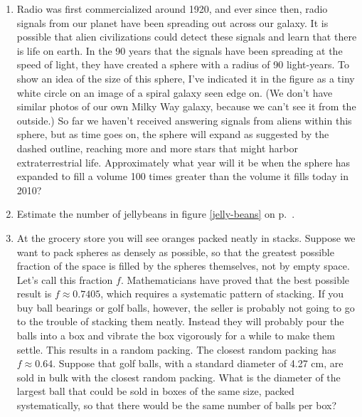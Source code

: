 \begin{enumerate}
\item 
Radio was first commercialized around 1920, and ever since then, radio signals from our
planet have been spreading out across our galaxy. It is possible that alien civilizations
could detect these signals and learn that there is life on earth. In the 90 years that
the signals have been spreading at the speed of light, they have created a sphere with a radius of 90 light-years.
To show an idea of the size of this sphere, I've indicated it in the figure as a tiny white circle on an image
of a spiral galaxy seen edge on. (We don't have similar photos of our own Milky Way galaxy, because we can't
see it from the outside.) So far we haven't received answering signals from aliens within this sphere,
but as time goes on, the sphere will expand as suggested by the dashed outline, reaching more and more stars that might harbor extraterrestrial
life. Approximately what year will it be when the sphere has expanded to fill a volume 100 times greater than
the volume it fills today in 2010?





\vspace{1.5mm}

\item
Estimate the number of jellybeans in figure \ref{jelly-beans} on p.~\pageref{fig:jelly-beans}.


\item 
At the grocery store you will see oranges packed neatly in stacks.
Suppose we want to pack spheres as densely as possible, so that the greatest
possible fraction of the space is filled by the spheres themselves, not
by empty space. Let's call this fraction $f$.
Mathematicians have proved that the best possible result is $f\approx 0.7405$,
which requires a systematic pattern of stacking. If you buy ball bearings or golf
balls, however, the seller is probably not going to go to the trouble of stacking
them neatly. Instead they will probably pour the balls into a box and vibrate the
box vigorously for a while to make them settle. This results in a random packing.
The closest random packing has $f\approx 0.64$.
Suppose that golf balls, with a standard diameter of 4.27 cm, are sold in bulk
with the closest random packing. What is the diameter of the largest ball that
could be sold in boxes of the same size, packed systematically, so that there
would be the same number of balls per box?





\end{enumerate}
